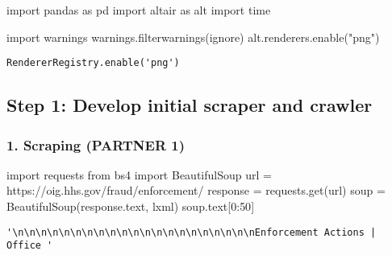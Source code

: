 \documentclass[
  letterpaper,
  DIV=11,
  numbers=noendperiod]{scrartcl}
\newenvironment{Shaded}{\begin{snugshade}}{\end{snugshade}}
\newcommand{\DecValTok}[1]{\textcolor[rgb]{0.68,0.00,0.00}{#1}}
\newcommand{\ImportTok}[1]{\textcolor[rgb]{0.00,0.46,0.62}{#1}}
\newcommand{\NormalTok}[1]{\textcolor[rgb]{0.00,0.23,0.31}{#1}}
\newcommand{\OperatorTok}[1]{\textcolor[rgb]{0.37,0.37,0.37}{#1}}
\newcommand{\StringTok}[1]{\textcolor[rgb]{0.13,0.47,0.30}{#1}}
\begin{document}
\newpage

\begin{Shaded}
\begin{Highlighting}[]
\ImportTok{import}\NormalTok{ pandas }\ImportTok{as}\NormalTok{ pd}
\ImportTok{import}\NormalTok{ altair }\ImportTok{as}\NormalTok{ alt}
\ImportTok{import}\NormalTok{ time}

\ImportTok{import}\NormalTok{ warnings }
\NormalTok{warnings.filterwarnings(}\StringTok{\textquotesingle{}ignore\textquotesingle{}}\NormalTok{)}
\NormalTok{alt.renderers.enable(}\StringTok{"png"}\NormalTok{)}
\end{Highlighting}
\end{Shaded}

\begin{verbatim}
RendererRegistry.enable('png')
\end{verbatim}

\subsection{Step 1: Develop initial scraper and
crawler}\label{step-1-develop-initial-scraper-and-crawler}

\subsubsection{1. Scraping (PARTNER 1)}\label{scraping-partner-1}

\begin{Shaded}
\begin{Highlighting}[]
\ImportTok{import}\NormalTok{ requests}
\ImportTok{from}\NormalTok{ bs4 }\ImportTok{import}\NormalTok{ BeautifulSoup}
\NormalTok{url }\OperatorTok{=} \StringTok{\textquotesingle{}https://oig.hhs.gov/fraud/enforcement/\textquotesingle{}}
\NormalTok{response }\OperatorTok{=}\NormalTok{ requests.get(url)}
\NormalTok{soup }\OperatorTok{=}\NormalTok{ BeautifulSoup(response.text, }\StringTok{\textquotesingle{}lxml\textquotesingle{}}\NormalTok{)}
\NormalTok{soup.text[}\DecValTok{0}\NormalTok{:}\DecValTok{50}\NormalTok{]}
\end{Highlighting}
\end{Shaded}

\begin{verbatim}
'\n\n\n\n\n\n\n\n\n\n\n\n\n\n\n\n\n\n\n\n\nEnforcement Actions | Office '
\end{verbatim}
\end{document}
